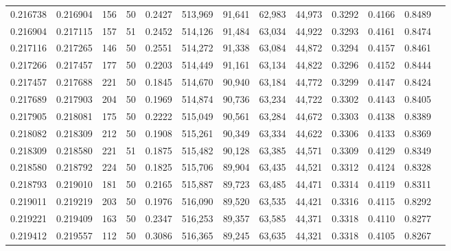 \begin{tabular}{rrrrrrrrrrrrr}
0.216738 & 0.216904 &   156 &  50 &                                     0.2427 & 513,969 &  91,641 &  62,983 &  44,973 & 0.3292 & 0.4166 & 0.8489 \\
0.216904 & 0.217115 &   157 &  51 &                                     0.2452 & 514,126 &  91,484 &  63,034 &  44,922 & 0.3293 & 0.4161 & 0.8474 \\
0.217116 & 0.217265 &   146 &  50 &                                     0.2551 & 514,272 &  91,338 &  63,084 &  44,872 & 0.3294 & 0.4157 & 0.8461 \\
0.217266 & 0.217457 &   177 &  50 &                                     0.2203 & 514,449 &  91,161 &  63,134 &  44,822 & 0.3296 & 0.4152 & 0.8444 \\
0.217457 & 0.217688 &   221 &  50 &                                     0.1845 & 514,670 &  90,940 &  63,184 &  44,772 & 0.3299 & 0.4147 & 0.8424 \\
0.217689 & 0.217903 &   204 &  50 &                                     0.1969 & 514,874 &  90,736 &  63,234 &  44,722 & 0.3302 & 0.4143 & 0.8405 \\
0.217905 & 0.218081 &   175 &  50 &                                     0.2222 & 515,049 &  90,561 &  63,284 &  44,672 & 0.3303 & 0.4138 & 0.8389 \\
0.218082 & 0.218309 &   212 &  50 &                                     0.1908 & 515,261 &  90,349 &  63,334 &  44,622 & 0.3306 & 0.4133 & 0.8369 \\
0.218309 & 0.218580 &   221 &  51 &                                     0.1875 & 515,482 &  90,128 &  63,385 &  44,571 & 0.3309 & 0.4129 & 0.8349 \\
0.218580 & 0.218792 &   224 &  50 &                                     0.1825 & 515,706 &  89,904 &  63,435 &  44,521 & 0.3312 & 0.4124 & 0.8328 \\
0.218793 & 0.219010 &   181 &  50 &                                     0.2165 & 515,887 &  89,723 &  63,485 &  44,471 & 0.3314 & 0.4119 & 0.8311 \\
0.219011 & 0.219219 &   203 &  50 &                                     0.1976 & 516,090 &  89,520 &  63,535 &  44,421 & 0.3316 & 0.4115 & 0.8292 \\
0.219221 & 0.219409 &   163 &  50 &                                     0.2347 & 516,253 &  89,357 &  63,585 &  44,371 & 0.3318 & 0.4110 & 0.8277 \\
0.219412 & 0.219557 &   112 &  50 &                                     0.3086 & 516,365 &  89,245 &  63,635 &  44,321 & 0.3318 & 0.4105 & 0.8267 \\

\end{tabular}
